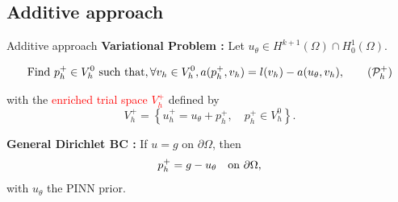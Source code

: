 \subsection{Additive approach}

\begin{frame}{Additive approach}
	\textbf{Variational Problem :} Let $u_{\theta} \in H^{k+1}(\Omega)\cap H^1_0(\Omega)$.
	
	\vspace{-5pt}
	\begin{equation}
		\label{eq:weakplus}
		\text{Find } p_h^+ \in V_h^0 \text{ such that}, \forall v_h \in V_h^0, a(p_h^+,v_h) = l(v_h) - a(u_{\theta},v_h),\tag{$\mathcal{P}_h^+$}
	\end{equation}
	
	\vspace{5pt}
	\begin{minipage}[t]{0.6\linewidth}
		with the \textcolor{red}{enriched trial space $V_h^+$} defined by
		\begin{equation*}
			V_h^+ = \left\{
			u_h^+= u_{\theta} + p_h^+, \quad p_h^+ \in V_h^0
			\right\}.
		\end{equation*}
	
		\vspace{20pt}
	
		\textbf{General Dirichlet BC :} If $u=g$ on $\partial \Omega$, then
		\[
			p_h^+ = g - u_{\theta} \text{\quad on } \partial \Omega,
		\]
		with $u_\theta$ the PINN prior. 
	\end{minipage} \qquad \begin{minipage}[t][][b]{0.28\linewidth}
		\vspace{-15pt}
		\centering
	\end{minipage}
\end{frame}

